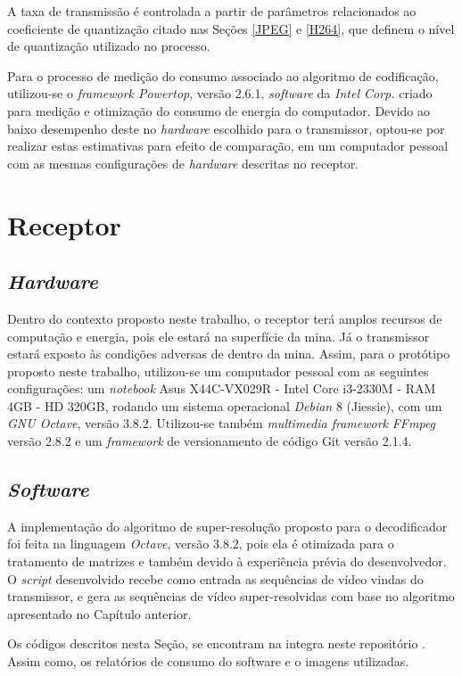     A taxa de transmissão é controlada a partir de parâmetros relacionados ao coeficiente de quantização citado nas Seções \ref{JPEG} e \ref{H264}, que definem o nível de quantização utilizado no processo. 
	
	Para o processo de medição do consumo associado ao algoritmo de codificação, utilizou-se o \textit{framework Powertop}, versão 2.6.1, \textit{software} da \textit{Intel Corp.} criado para medição e otimização do consumo de energia do computador.  Devido ao baixo desempenho deste  no \textit{hardware} escolhido para o transmissor, optou-se por realizar estas estimativas para efeito de comparação, em um computador pessoal com as mesmas configurações de \textit{hardware} descritas no receptor. 
\section{Receptor}

\subsection{\textit{Hardware}}

    Dentro do contexto proposto neste trabalho, o receptor terá amplos recursos de computação e energia, pois ele estará na superfície da mina. Já o transmissor estará exposto às condições adversas de dentro da mina. Assim, para o protótipo proposto neste trabalho, utilizou-se um computador pessoal com as seguintes configurações: um \textit{notebook} Asus X44C-VX029R - Intel Core i3-2330M - RAM 4GB - HD 320GB, rodando um sistema operacional \textit{Debian} 8 (Jiessie), com um \textit{GNU Octave}, versão 3.8.2. Utilizou-se também \textit{multimedia framework} \textit{FFmpeg} versão 2.8.2 e um \textit{framework} de versionamento de código Git versão 2.1.4. 


\subsection{\textit{Software}}

    A implementação do algoritmo de super-resolução proposto para o decodificador foi feita na linguagem \textit{Octave}, versão 3.8.2, pois ela é otimizada para o tratamento de matrizes e também devido à experiência prévia do desenvolvedor. O \textit{script} desenvolvido recebe como entrada as sequências de vídeo vindas do transmissor, e gera as sequências de vídeo super-resolvidas com base no algoritmo apresentado no Capítulo anterior.
    
    Os códigos descritos nesta Seção, se encontram na integra neste repositório \cite{repo}. Assim como, os relatórios de consumo do software e o imagens utilizadas. 

 